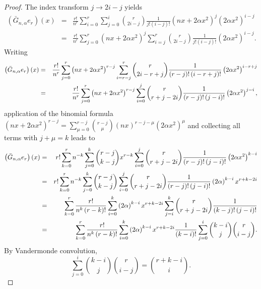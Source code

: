\documentclass[11pt,a4paper]{article}
\begin{document}
\begin{proof}
The index transform $j\rightarrow 2i-j$ yields 
\begin{eqnarray*}
\left( \bar{G}_{n,\alpha }e_{r}\right) \left( x\right) &=&\frac{r!}{n^{r}}%
\sum_{i=0}^{r}\sum_{j=0}^{i}\binom{r}{2i-j}\frac{1}{j!\left( i-j\right) !}%
\left( nx+2\alpha x^{2}\right) ^{j}\left( 2\alpha x^{2}\right) ^{i-j} \\
&=&\frac{r!}{n^{r}}\sum_{j=0}^{r}\left( nx+2\alpha x^{2}\right)
^{j}\sum_{i=j}^{r}\binom{r}{2i-j}\frac{1}{j!\left( i-j\right) !}\left(
2\alpha x^{2}\right) ^{i-j}.
\end{eqnarray*}%
Writing 
\begin{eqnarray*}
\left( \bar{G}_{n,\alpha }e_{r}\right) \left( x\right) &=&\frac{r!}{n^{r}}%
\sum_{j=0}^{r}\left( nx+2\alpha x^{2}\right) ^{r-j}\sum_{i=r-j}^{r}\binom{r}{%
2i-r+j}\frac{1}{\left( r-j\right) !\left( i-r+j\right) !}\left( 2\alpha
x^{2}\right) ^{i-r+j} \\
&=&\frac{r!}{n^{r}}\sum_{j=0}^{r}\left( nx+2\alpha x^{2}\right)
^{r-j}\sum_{i=0}^{j}\binom{r}{r+j-2i}\frac{1}{\left( r-j\right) !\left(
j-i\right) !}\left( 2\alpha x^{2}\right) ^{j-i},
\end{eqnarray*}%
application of the binomial formula $\left( nx+2\alpha x^{2}\right)
^{r-j}=\sum_{\mu =0}^{r-j}\binom{r-j}{\mu }\left( nx\right) ^{r-j-\mu
}\left( 2\alpha x^{2}\right) ^{\mu }$ and collecting all terms with $j+\mu
=k $ leads to 
\begin{eqnarray*}
\left( \bar{G}_{n,\alpha }e_{r}\right) \left( x\right)
&=&r!\sum_{k=0}^{r}n^{-k}\sum_{j=0}^{k}\binom{r-j}{k-j}x^{r-k}\sum_{i=0}^{j}%
\binom{r}{r+j-2i}\frac{1}{\left( r-j\right) !\left( j-i\right) !}\left(
2\alpha x^{2}\right) ^{k-i} \\
&=&r!\sum_{k=0}^{r}n^{-k}\sum_{j=0}^{k}\binom{r-j}{k-j}\sum_{i=0}^{j}\binom{r%
}{r+j-2i}\frac{1}{\left( r-j\right) !\left( j-i\right) !}\left( 2\alpha
\right) ^{k-i}x^{r+k-2i} \\
&=&\sum_{k=0}^{r}\frac{r!}{n^{k}\left( r-k\right) !}\sum_{i=0}^{k}\left(
2\alpha \right) ^{k-i}x^{r+k-2i}\sum_{j=i}^{k}\binom{r}{r+j-2i}\frac{1}{%
\left( k-j\right) !\left( j-i\right) !} \\
&=&\sum_{k=0}^{r}\frac{r!}{n^{k}\left( r-k\right) !}\sum_{i=0}^{k}\left(
2\alpha \right) ^{k-i}x^{r+k-2i}\frac{1}{\left( k-i\right) !}\sum_{j=0}^{i}%
\binom{k-i}{j}\binom{r}{i-j}.
\end{eqnarray*}%
By Vandermonde convolution, 
\begin{equation*}
\sum_{j=0}^{i}\binom{k-i}{j}\binom{r}{i-j}=\binom{r+k-i}{i}.
\end{equation*}%

\end{proof}
\end{document}
